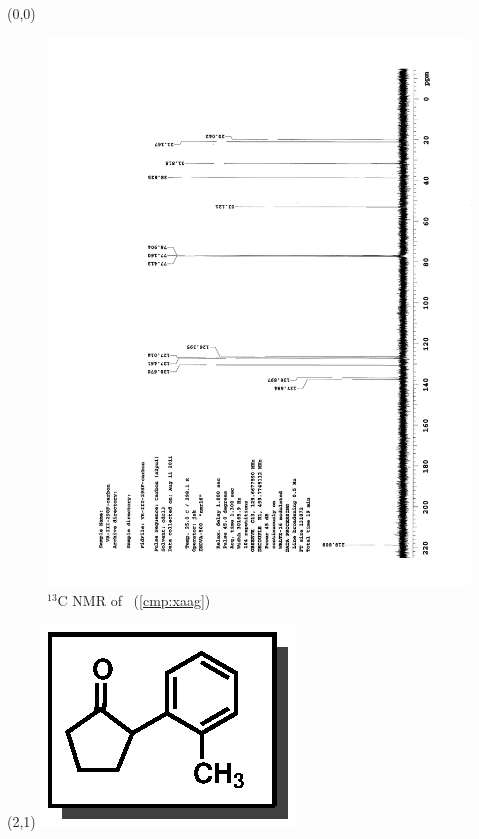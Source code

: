 \clearpage
\begin{textblock}{20}(0,0)
\begin{figure}[htb]
\caption{$^{13}$C NMR of  \CMPxaag\ (\ref{cmp:xaag})}
\includegraphics[scale=0.75, trim = 0mm 0mm 0mm 5mm,
clip]{chp_asymmetric/images/nmr/xaagC}
\vspace{-100pt}
\end{figure}
\end{textblock}
\begin{textblock}{1}(2,1)
\includegraphics[scale=0.8, angle=90]{chp_asymmetric/images/xaag}
\end{textblock}
\clearpage

